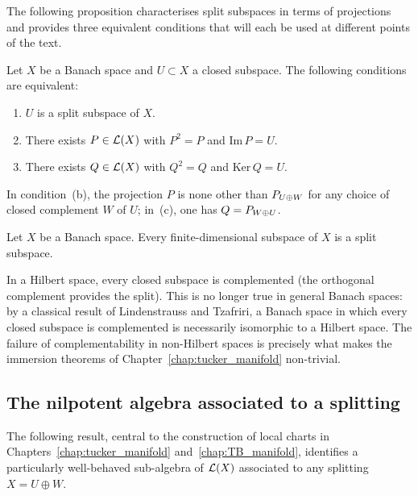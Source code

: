 The following proposition characterises split subspaces in terms of
projections and provides three equivalent conditions that will each be
used at different points of the text.

\begin{proposition}
\label{prop:split_equiv}
Let $X$ be a Banach space and $U \subset X$ a closed subspace. The
following conditions are equivalent:
\begin{enumerate}
\item[\textup{(a)}] $U$ is a split subspace of $X$.
\item[\textup{(b)}] There exists $P \in \mathcal{L}(X)$ with $P^2 = P$ and
    $\mathrm{Im}\,P = U$.
\item[\textup{(c)}] There exists $Q \in \mathcal{L}(X)$ with $Q^2 = Q$ and
    $\mathrm{Ker}\,Q = U$.
\end{enumerate}
\end{proposition}

In condition~(b), the projection $P$ is none other than $P_{U \oplus W}$
for any choice of closed complement $W$ of $U$; in~(c), one has $Q =
P_{W \oplus U}$.

\begin{proposition}
\label{prop:finitedim_split}
Let $X$ be a Banach space. Every finite-dimensional subspace of $X$ is
a split subspace.
\end{proposition}

In a Hilbert space, every closed subspace is complemented (the orthogonal
complement provides the split). This is no longer true in general Banach
spaces: by a classical result of Lindenstrauss and Tzafriri, a Banach
space in which every closed subspace is complemented is necessarily
isomorphic to a Hilbert space. The failure of complementability in
non-Hilbert spaces is precisely what makes the immersion theorems of
Chapter~\ref{chap:tucker_manifold} non-trivial.

\subsection*{The nilpotent algebra associated to a splitting}

The following result, central to the construction of local charts in
Chapters~\ref{chap:tucker_manifold} and~\ref{chap:TB_manifold},
identifies a particularly well-behaved sub-algebra of $\mathcal{L}(X)$
associated to any splitting $X = U \oplus W$.

